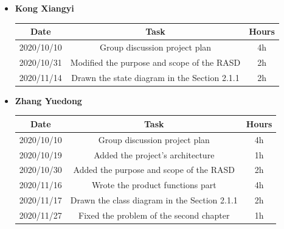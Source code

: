 \documentclass[a4paper,12pt]{book}
\begin{document}
\begin{itemize}
	\item \textbf{Kong Xiangyi}
	\begin{center}
		\begin{tabular}{ |c|c|c| } 
			\hline
			Date & Task & Hours \\
			\hline
			\hline
			2020/10/10 & Group discussion project plan & 4h \\ 
			\hline
			2020/10/31 & Modified the purpose and scope of the RASD & 2h \\ 
			\hline
			2020/11/14 & Drawn the state diagram in the Section 2.1.1 & 2h \\ 
			\hline
		\end{tabular}
	\end{center}
	\item \textbf{Zhang Yuedong}
	\begin{center}
		\begin{tabular}{ |c|c|c| } 
			\hline
			Date & Task & Hours \\
			\hline
			\hline
			2020/10/10 & Group discussion project plan & 4h \\ 
			\hline
			2020/10/19 & Added the project's architecture & 1h \\ 
			\hline
			2020/10/30 & Added the purpose and scope of the RASD & 2h \\ 
			\hline
			2020/11/16 & Wrote the product functions part & 4h \\ 
			\hline
			2020/11/17 & Drawn the class diagram in the Section 2.1.1  & 2h \\ 
			\hline
			2020/11/27 & Fixed the problem of the second chapter & 1h \\
			\hline
		\end{tabular}
	\end{center}
\end{itemize}


\backmatter
\end{document}
